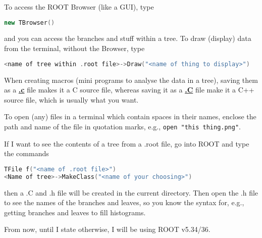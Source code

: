 To access the ROOT Browser (like a GUI), type

\begin{lstlisting}[belowskip=-0.7cm, language=C++, numbers=none]
new TBrowser()
\end{lstlisting}

and you can access the branches and stuff within a tree. To draw (display) data from the terminal, without the Browser, type

\begin{lstlisting}[belowskip=-0.7cm, language=C++, numbers=none]
<name of tree within .root file>->Draw("<name of thing to display>")
\end{lstlisting}

When creating macros (mini programs to analyse the data in a tree), saving them as a \underline{\textbf{.c}} file makes it a C source file, whereas saving it as a \underline{\textbf{.C}} file make it a C++ source file, which is usually what you want.

To open (any) files in a terminal which contain spaces in their names, enclose the path and name of the file in quotation marks, e.g., \verb!open "this thing.png"!.

If I want to see the contents of a tree from a .root file, go into ROOT and type the commands

\begin{lstlisting}[belowskip=-0.7cm, language=C++, numbers=none]
TFile f("<name of .root file>")
<Name of tree>->MakeClass("<name of your choosing>")
\end{lstlisting}

then a .C and .h file will be created in the current directory. Then open the .h file to see the names of the branches and leaves, so you know the syntax for, e.g., getting branches and leaves to fill histograms.


From now, until I state otherwise, I will be using ROOT v5.34/36.
